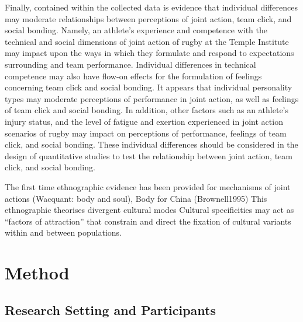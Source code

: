 Finally, contained within the collected data is evidence that individual differences may moderate relationships between perceptions of joint action, team click, and social bonding.  Namely, an athlete's experience and competence with the technical and social dimensions of joint action of rugby at the Temple Institute may impact upon the ways in which they formulate and respond to expectations surrounding and team performance.  Individual differences in technical competence may also have flow-on effects for the formulation of feelings concerning team click and social bonding. It appears that individual personality types may moderate perceptions of performance in joint action, as well as feelings of team click and social bonding. In addition, other factors such as an athlete's injury status, and the level of fatigue and exertion experienced in joint action scenarios of rugby may impact on perceptions of performance, feelings of team click, and social bonding.  These individual differences should be considered in the design of quantitative studies to test the relationship between joint action, team click, and social bonding.



The first time ethnographic evidence has been provided for mechanisms of joint actions (Wacquant: body and soul), Body for China (Brownell1995)
This ethnographic theorises divergent cultural modes
Cultural specificities may act as ``factors of attraction'' \citep{Sperber2014} that constrain and direct the fixation of cultural variants within and between populations.














\section{Method}




\subsection{Research Setting and Participants}

